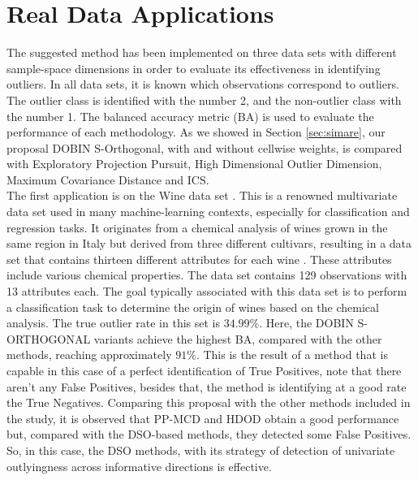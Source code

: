 \documentclass[12pt]{article}
\begin{document}
\section{Real Data Applications}\label{sec:applic}

The suggested method has been implemented on three data sets with different sample-space dimensions in order to evaluate its effectiveness in identifying outliers. In all data sets, it is known which observations correspond to outliers. The outlier class is identified with the number 2, and the non-outlier class with the number 1. The balanced accuracy metric (BA) is used to evaluate the performance of each methodology. As we showed in Section \ref{sec:simare}, our proposal DOBIN S-Orthogonal, with and without cellwise weights, is compared with Exploratory Projection Pursuit, High Dimensional Outlier Dimension, Maximum Covariance Distance and ICS.\\

The first application is on the Wine data set \citep{misc_wine_109}. This is a renowned multivariate data set used in many machine-learning contexts, especially for classification and regression tasks. It originates from a chemical analysis of wines grown in the same region in Italy but derived from three different cultivars, resulting in a data set that contains thirteen different attributes for each wine \citep{sathe2016lodes}. These attributes include various chemical properties. The data set contains 129 observations with 13 attributes each. The goal typically associated with this data set is to perform a classification task to determine the origin of wines based on the chemical analysis. The true outlier rate in this set is $34.99\%$. Here, the DOBIN S-ORTHOGONAL variants achieve the highest BA, compared with the other methods, reaching approximately $91\%$. This is the result of a method that is capable in this case of a perfect identification of True Positives, note that there aren't any False Positives, besides that, the method is identifying at a good rate the True Negatives. Comparing this proposal with the other methods included in the study, it is observed that PP-MCD and HDOD obtain a good performance but, compared with the DSO-based methods, they detected some False Positives. So, in this case, the DSO methods, with its strategy of detection of univariate outlyingness across informative directions is effective.
\\  
\end{document}
